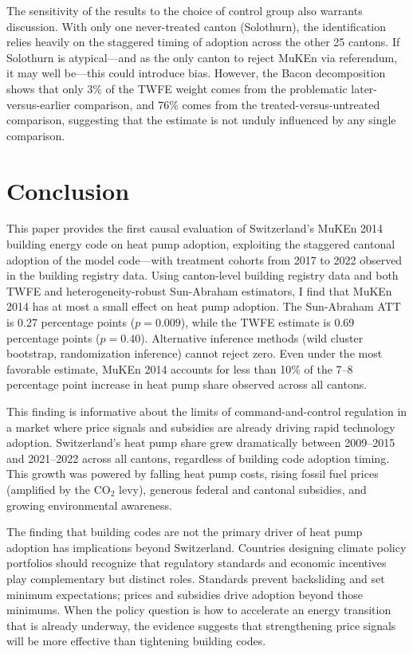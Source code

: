 \documentclass[12pt]{article}
\begin{document}
The sensitivity of the results to the choice of control group also warrants discussion. With only one never-treated canton (Solothurn), the identification relies heavily on the staggered timing of adoption across the other 25 cantons. If Solothurn is atypical---and as the only canton to reject MuKEn via referendum, it may well be---this could introduce bias. However, the Bacon decomposition shows that only 3\% of the TWFE weight comes from the problematic later-versus-earlier comparison, and 76\% comes from the treated-versus-untreated comparison, suggesting that the estimate is not unduly influenced by any single comparison.


\section{Conclusion}

This paper provides the first causal evaluation of Switzerland's MuKEn 2014 building energy code on heat pump adoption, exploiting the staggered cantonal adoption of the model code---with treatment cohorts from 2017 to 2022 observed in the building registry data. Using canton-level building registry data and both TWFE and heterogeneity-robust Sun-Abraham estimators, I find that MuKEn 2014 has at most a small effect on heat pump adoption. The Sun-Abraham ATT is 0.27 percentage points ($p = 0.009$), while the TWFE estimate is 0.69 percentage points ($p = 0.40$). Alternative inference methods (wild cluster bootstrap, randomization inference) cannot reject zero. Even under the most favorable estimate, MuKEn 2014 accounts for less than 10\% of the 7--8 percentage point increase in heat pump share observed across all cantons.

This finding is informative about the limits of command-and-control regulation in a market where price signals and subsidies are already driving rapid technology adoption. Switzerland's heat pump share grew dramatically between 2009--2015 and 2021--2022 across all cantons, regardless of building code adoption timing. This growth was powered by falling heat pump costs, rising fossil fuel prices (amplified by the CO$_2$ levy), generous federal and cantonal subsidies, and growing environmental awareness.

The finding that building codes are not the primary driver of heat pump adoption has implications beyond Switzerland. Countries designing climate policy portfolios should recognize that regulatory standards and economic incentives play complementary but distinct roles. Standards prevent backsliding and set minimum expectations; prices and subsidies drive adoption beyond those minimums. When the policy question is how to accelerate an energy transition that is already underway, the evidence suggests that strengthening price signals will be more effective than tightening building codes.
\end{document}
